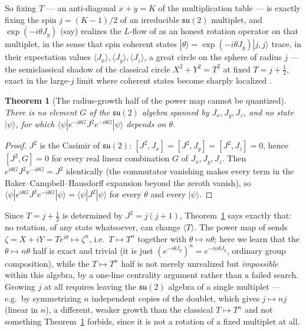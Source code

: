 \documentclass[11pt]{amsart}
\newtheorem{theorem}{Theorem}[section]
\theoremstyle{remark}
\begin{document}
So fixing $T$ --- an anti-diagonal $x+y=K$ of the multiplication table --- is exactly fixing the spin $j=(K-1)/2$ of an irreducible $\mathfrak{su}(2)$ multiplet, and $\exp(-i\theta J_y)$ (say) realizes the $L$-flow of \cite{Ebert2026EigenCoord} as an honest rotation operator on that multiplet, in the sense that spin coherent states $|\theta\rangle=\exp(-i\theta J_y)|j,j\rangle$ trace, in their expectation values $\langle J_x\rangle,\langle J_y\rangle,\langle J_z\rangle$, a great circle on the sphere of radius $j$ --- the semiclassical shadow of the classical circle $X^2+Y^2=T^2$ at fixed $T=j+\tfrac12$, exact in the large-$j$ limit where coherent states become sharply localized \cite{Radcliffe1971,Arecchi1972}.

\begin{theorem}[The radius-growth half of the power map cannot be quantized]\label{thm:nogo-L}
There is no element $G$ of the $\mathfrak{su}(2)$ algebra spanned by $J_x,J_y,J_z$, and no state $|\psi\rangle$, for which $\langle\psi|e^{-i\theta G}J^2e^{-i\theta G}|\psi\rangle$ depends on $\theta$.
\end{theorem}

\begin{proof}
$J^2$ is the Casimir of $\mathfrak{su}(2)$: $[J^2,J_x]=[J^2,J_y]=[J^2,J_z]=0$, hence $[J^2,G]=0$ for every real linear combination $G$ of $J_x,J_y,J_z$. Then $e^{i\theta G}J^2e^{-i\theta G}=J^2$ identically (the commutator vanishing makes every term in the Baker--Campbell--Hausdorff expansion beyond the zeroth vanish), so $\langle\psi|e^{i\theta G}J^2e^{-i\theta G}|\psi\rangle=\langle\psi|J^2|\psi\rangle$ for every $\theta$ and every $|\psi\rangle$.
\end{proof}

Since $T=j+\tfrac12$ is determined by $J^2=j(j+1)$, Theorem~\ref{thm:nogo-L} says exactly that: no rotation, of any state whatsoever, can change $\langle T\rangle$. The power map of \cite{Ebert2026EigenCoord} sends $\zeta=X+iY=Te^{i\theta}\mapsto\zeta^n$, i.e.\ $T\mapsto T^n$ together with $\theta\mapsto n\theta$; here we learn that the $\theta\mapsto n\theta$ half is exact and trivial (it is just $(e^{-i\theta J_y})^n=e^{-in\theta J_y}$, ordinary group composition), while the $T\mapsto T^n$ half is not merely unrealized but \emph{impossible} within this algebra, by a one-line centrality argument rather than a failed search. Growing $j$ at all requires leaving the $\mathfrak{su}(2)$ algebra of a single multiplet --- e.g.\ by symmetrizing $n$ independent copies of the doublet, which gives $j\mapsto nj$ (linear in $n$), a different, weaker growth than the classical $T\mapsto T^n$ and not something Theorem~\ref{thm:nogo-L} forbids, since it is not a rotation of a fixed multiplet at all.
\end{document}

